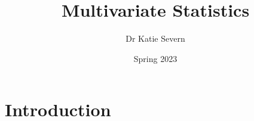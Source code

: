 \documentclass[
]{book}
\title{Multivariate Statistics}
\author{Dr Katie Severn}
\date{Spring 2023}
\theoremstyle{definition}
\theoremstyle{definition}
\theoremstyle{definition}
\theoremstyle{definition}
\theoremstyle{remark}
\begin{document}
\maketitle

{
\setcounter{tocdepth}{1}
\tableofcontents
}
\hypertarget{introduction}{%
\chapter*{Introduction}\label{introduction}}

\newcommand{\bmu}{{\boldsymbol{\mu}}}
\newcommand{\bSigma}{\boldsymbol{\Sigma}}
\newcommand{\bLambda}{\boldsymbol \Lambda}
\newcommand{\bgamma}{\boldsymbol \gamma}
\newcommand{\bGamma}{\boldsymbol \Gamma}
\newcommand{\btheta}{\boldsymbol \theta}
\newcommand{\bdelta}{\boldsymbol \delta}
\newcommand{\bbeta}{\boldsymbol \beta}
\newcommand{\blambda}{\boldsymbol \lambda}
\newcommand{\bepsilon}{\boldsymbol \epsilon}
\newcommand{\balpha}{\boldsymbol \alpha}

\newcommand{\bA}{\mathbf A}
\newcommand{\bB}{\mathbf B}
\newcommand{\bC}{\mathbf C}
\newcommand{\bD}{\mathbf D}
\newcommand{\bE}{\mathbf E}
\newcommand{\bF}{\mathbf F}
\newcommand{\bG}{\mathbf G}
\newcommand{\bH}{\mathbf H}
\newcommand{\bI}{\mathbf I}
\newcommand{\bL}{\mathbf L}
\newcommand{\bM}{\mathbf M}
\newcommand{\bP}{\mathbf P}
\newcommand{\bQ}{\mathbf Q}
\newcommand{\bR}{\mathbf R}
\newcommand{\mR}{\mathbb R}
\newcommand{\bS}{\mathbf S}
\newcommand{\bT}{\mathbf T}
\newcommand{\bV}{\mathbf V}
\newcommand{\bU}{\mathbf U}
\newcommand{\bW}{\mathbf W}
\newcommand{\bX}{\mathbf X}
\newcommand{\bY}{\mathbf Y}
\newcommand{\bZ}{\mathbf Z}
\newcommand{\rd}{\mathrm d}

\newcommand{\ba}{\mathbf a}
\newcommand{\bb}{\mathbf b}
\newcommand{\bc}{\mathbf c}
\newcommand{\bd}{\mathbf d}
\newcommand{\be}{\mathbf e}
\newcommand{\bg}{\mathbf g}
\newcommand{\bh}{\mathbf h}
\newcommand{\bk}{\mathbf k}
\newcommand{\bn}{\mathbf n}
\newcommand{\bp}{\mathbf p}
\newcommand{\bq}{\mathbf q}
\newcommand{\br}{\mathbf r}
\newcommand{\bt}{{\mathbf t}}
\newcommand{\bu}{\mathbf u}
\newcommand{\bv}{\mathbf v}
\newcommand{\bw}{\mathbf w}
\newcommand{\bx}{\mathbf x}
\newcommand{\by}{\mathbf y}
\newcommand{\bz}{\mathbf z}

\newcommand{\bzero}{\boldsymbol 0}

\newcommand{\cR}{\mathcal R}

\newcommand{\bs}{\boldsymbol}
\newcommand{\ds}{\displaystyle}
\newcommand{\tdiag}{\text{diag}}
\newcommand{\ttr}{\text{tr}}
\newcommand{\tmin}{\text{min}}
\newcommand{\tmax}{\text{max}}
\newcommand{\tdet}{\text{det}}
\newcommand{\tr}{\operatorname{tr}}
\newcommand{\indep}{\perp \!\!\! \perp}
\end{document}
